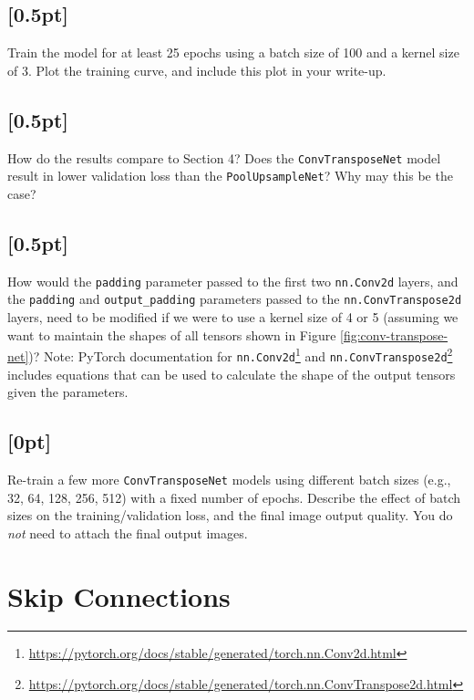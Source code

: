 \subsection{{\color{blue}[0.5pt] \LIV}}

Train the model for at least 25 epochs using a batch size of 100 and a kernel size of 3.  Plot the training curve, and include this plot in your write-up.

\subsection{{\color{blue}[0.5pt] \LIII}}

How do the results compare to Section 4? Does the \texttt{ConvTransposeNet} model result in lower validation loss than the \texttt{PoolUpsampleNet}? Why may this be the case?

\subsection{{\color{blue}[0.5pt] \LIII}}

How would the \texttt{padding} parameter passed to the first two \texttt{nn.Conv2d} layers, and the \texttt{padding} and \texttt{output\_padding} parameters passed to the \texttt{nn.ConvTranspose2d} layers, need to be modified if we were to use a kernel size of 4 or 5 (assuming we want to maintain the shapes of all tensors shown in Figure \ref{fig:conv-transpose-net})?
Note: PyTorch documentation for \texttt{nn.Conv2d}\footnote{\url{https://pytorch.org/docs/stable/generated/torch.nn.Conv2d.html}} and \texttt{nn.ConvTranspose2d}\footnote{\url{https://pytorch.org/docs/stable/generated/torch.nn.ConvTranspose2d.html}} includes equations that can be used to calculate the shape of the output tensors given the parameters.

\subsection{{\color{blue}[0pt] \LIV}}

Re-train a few more \texttt{ConvTransposeNet} models using different batch sizes (e.g., 32, 64, 128, 256, 512) with a fixed number of epochs. Describe the effect of batch sizes on the training/validation loss, and the final image output quality. You do \textit{not} need to attach the final output images.

\section{Skip Connections}

